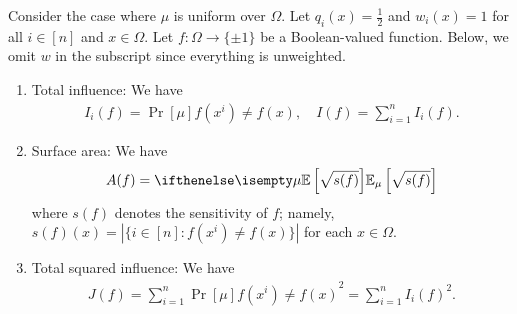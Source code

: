\begin{example}
    Consider the case where $\mu$ is uniform over $\Omega$. Let $q_i(x) = \frac{1}{2}$ and $w_i(x) = 1$ for all $i \in [n]$ and $x \in \Omega$.
    Let $f: \Omega \to \{\pm 1\}$ be a Boolean-valued function. 
    Below, we omit $w$ in the subscript since everything is unweighted.

    \begin{enumerate}[(1)]
        \item Total influence: We have
        \begin{align*}
            I_i(f) = \Pr[\mu]{f(x^i) \neq f(x)}, \quad I(f) = \sum_{i=1}^n I_i(f).
        \end{align*}

        \item Surface area: We have
        \begin{align*}
            A(f) = \E[\mu]{\sqrt{s(f)}}
        \end{align*}
        where $s(f)$ denotes the sensitivity of $f$; namely, $s(f)(x) = |\{i \in [n]: f(x^i) \neq f(x)\}|$ for each $x \in \Omega$.
    
        \item Total squared influence: We have
        \begin{align*}
            J(f) = \sum_{i=1}^n \Pr[\mu]{f(x^i) \neq f(x)}^2 = \sum_{i=1}^n I_i(f)^2.
        \end{align*}
    \end{enumerate}
\end{example}



